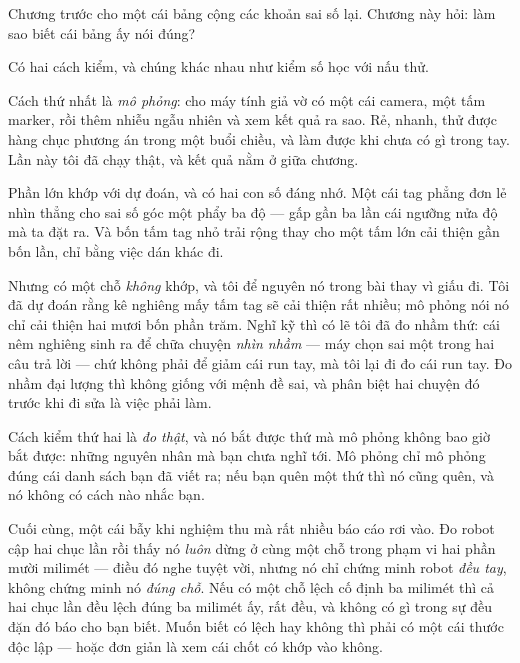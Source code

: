 \documentclass[../../marker.tex]{subfiles}
\begin{document}
\begin{dongian}
Chương trước cho một cái bảng cộng các khoản sai số lại. Chương này hỏi: làm sao biết cái bảng ấy nói đúng?

Có hai cách kiểm, và chúng khác nhau như kiểm số học với nấu thử.

Cách thứ nhất là \emph{mô phỏng}: cho máy tính giả vờ có một cái camera, một tấm marker, rồi thêm nhiễu ngẫu nhiên và xem kết quả ra sao. Rẻ, nhanh, thử được hàng chục phương án trong một buổi chiều, và làm được khi chưa có gì trong tay. Lần này tôi đã chạy thật, và kết quả nằm ở giữa chương.

Phần lớn khớp với dự đoán, và có hai con số đáng nhớ. Một cái tag phẳng đơn lẻ nhìn thẳng cho sai số góc một phẩy ba độ --- gấp gần ba lần cái ngưỡng nửa độ mà ta đặt ra. Và bốn tấm tag nhỏ trải rộng thay cho một tấm lớn cải thiện gần bốn lần, chỉ bằng việc dán khác đi.

Nhưng có một chỗ \emph{không} khớp, và tôi để nguyên nó trong bài thay vì giấu đi. Tôi đã dự đoán rằng kê nghiêng mấy tấm tag sẽ cải thiện rất nhiều; mô phỏng nói nó chỉ cải thiện hai mươi bốn phần trăm. Nghĩ kỹ thì có lẽ tôi đã đo nhầm thứ: cái nêm nghiêng sinh ra để chữa chuyện \emph{nhìn nhầm} --- máy chọn sai một trong hai câu trả lời --- chứ không phải để giảm cái run tay, mà tôi lại đi đo cái run tay. Đo nhầm đại lượng thì không giống với mệnh đề sai, và phân biệt hai chuyện đó trước khi đi sửa là việc phải làm.

Cách kiểm thứ hai là \emph{đo thật}, và nó bắt được thứ mà mô phỏng không bao giờ bắt được: những nguyên nhân mà bạn chưa nghĩ tới. Mô phỏng chỉ mô phỏng đúng cái danh sách bạn đã viết ra; nếu bạn quên một thứ thì nó cũng quên, và nó không có cách nào nhắc bạn.

Cuối cùng, một cái bẫy khi nghiệm thu mà rất nhiều báo cáo rơi vào. Đo robot cập hai chục lần rồi thấy nó \emph{luôn} dừng ở cùng một chỗ trong phạm vi hai phần mười milimét --- điều đó nghe tuyệt vời, nhưng nó chỉ chứng minh robot \emph{đều tay}, không chứng minh nó \emph{đúng chỗ}. Nếu có một chỗ lệch cố định ba milimét thì cả hai chục lần đều lệch đúng ba milimét ấy, rất đều, và không có gì trong sự đều đặn đó báo cho bạn biết. Muốn biết có lệch hay không thì phải có một cái thước độc lập --- hoặc đơn giản là xem cái chốt có khớp vào không.

\end{dongian}
\end{document}
